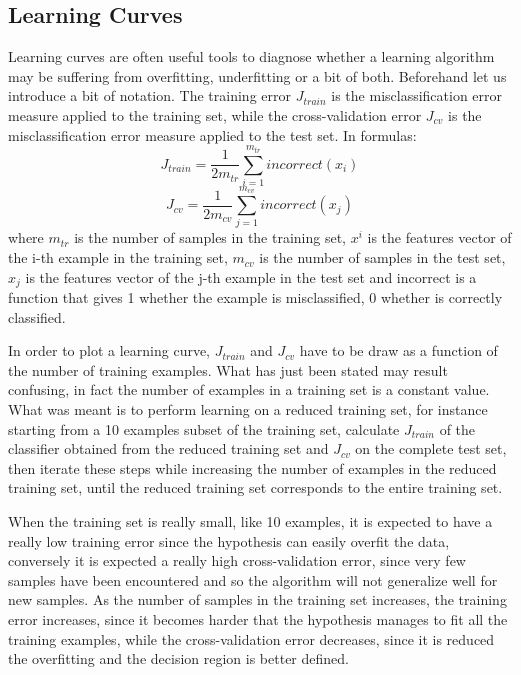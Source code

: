 \documentclass[aps,letterpaper,10pt]{revtex4}
\begin{document}
\subsection{Learning Curves}
Learning curves are often useful tools to diagnose whether a learning algorithm may be suffering from overfitting, underfitting or a bit of both. Beforehand let us introduce a bit  of notation. The  training error $J_{train}$ is the misclassification error measure applied to the training set, while the cross-validation error $J_{cv}$ is the misclassification error measure applied to the test set. In formulas:
\begin{equation}
J_{train} = \frac{1}{2m_{tr}} \sum_{i=1}^{m_{tr}}incorrect( x_i )
\end{equation}
\begin{equation}
J_{cv} = \frac{1}{2m_{cv}} \sum_{j=1}^{m_{cv}}incorrect( x_j )
\end{equation}
where $m_{tr}$ is the number of samples in the training set, $x^i$ is the features vector of the i-th example in the training set, $m_{cv}$ is the number of samples in the test set, $x_j$ is the features vector of the j-th example in the test set and incorrect is a function that gives 1 whether the example is misclassified, 0 whether is correctly classified.

In order to plot a learning curve, $J_{train}$ and $J_{cv}$ have to be draw as a function of the number of training examples. What has just been stated may result confusing, in fact the number of examples in a training set is a constant value. What was meant is to perform learning on a reduced training set, for instance starting from a 10 examples subset of the training set, calculate $J_{train}$ of the classifier obtained from the reduced training set and $J_{cv}$ on the complete test set, then iterate these steps while increasing the number of examples in the reduced training set, until the reduced training set corresponds to the entire training set.

When the training set is really small, like 10 examples, it is expected to have a really low
training error since the hypothesis can easily overfit the data, conversely it is expected a
really high cross-validation error, since very few samples have been encountered and so the
algorithm will not generalize well for new samples. As the number of samples in the
training set increases, the training error increases, since it becomes harder that the
hypothesis manages to fit all the training examples, while the cross-validation error
decreases, since it is reduced the overfitting and the decision region is better defined.
\end{document}
